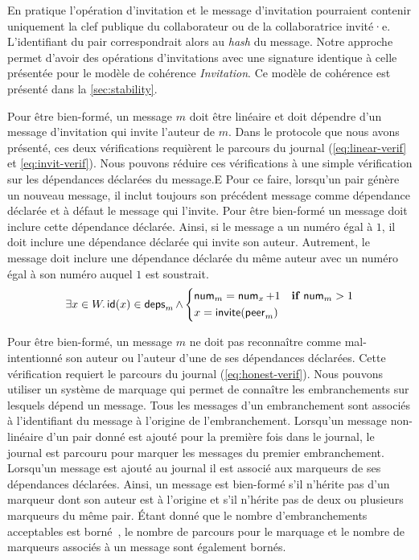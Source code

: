 En pratique l'opération d'invitation et le message d'invitation pourraient contenir uniquement la clef publique du collaborateur ou de la collaboratrice invité·e.
L'identifiant du pair correspondrait alors au \emph{hash} du message.
Notre approche permet d'avoir des opérations d'invitations avec une signature identique à celle présentée pour le modèle de cohérence \emph{Invitation}.
Ce modèle de cohérence est présenté dans la \autoref{sec:stability}.

Pour être bien-formé, un message $m$ doit être linéaire et doit dépendre d'un message d'invitation qui invite l'auteur de $m$.
Dans le protocole que nous avons présenté, ces deux vérifications requièrent le parcours du journal (\autoref{eq:linear-verif} et \autoref{eq:invit-verif}).
Nous pouvons réduire ces vérifications à une simple vérification sur les dépendances déclarées du message.E
Pour ce faire, lorsqu'un pair génère un nouveau message, il inclut toujours son précédent message comme dépendance déclarée et à défaut le message qui l'invite.
Pour être bien-formé un message doit inclure cette dépendance déclarée.
Ainsi, si le message a un numéro égal à $1$, il doit inclure une dépendance déclarée qui invite son auteur.
Autrement, le message doit inclure une dépendance déclarée du même auteur avec un numéro égal à son numéro auquel $1$ est soustrait.
%
\begin{equation}
    \exists x \in W \ldotp \operatorname{\mathsf{id}}(x) \in \operatorname{\mathsf{deps}}_m \land \begin{dcases}
    \operatorname{\mathsf{num}}_m = \operatorname{\mathsf{num}}_x + 1 & \mathrel{\mathbf{if}} \operatorname{\mathsf{num}}_m > 1\\
    x = \operatorname{\mathsf{invite}}(\operatorname{\mathsf{peer}}_m)
    \end{dcases}
\end{equation}

Pour être bien-formé, un message $m$ ne doit pas reconnaître comme mal-intentionné son auteur ou l'auteur d'une de ses dépendances déclarées.
Cette vérification requiert le parcours du journal (\autoref{eq:honest-verif}).
Nous pouvons utiliser un système de marquage qui permet de connaître les embranchements sur lesquels dépend un message.
Tous les messages d'un embranchement sont associés à l'identifiant du message à l'origine de l'embranchement.
Lorsqu'un message non-linéaire d'un pair donné est ajouté pour la première fois dans le journal, le journal est parcouru pour marquer les messages du premier embranchement.
Lorsqu'un message est ajouté au journal il est associé aux marqueurs de ses dépendances déclarées.
Ainsi, un message est bien-formé s'il n'hérite pas d'un marqueur dont son auteur est à l'origine et s'il n'hérite pas de deux ou plusieurs marqueurs du même pair.
Étant donné que le nombre d'embranchements acceptables est borné~\autocite{mahajan_2011_cac}, le nombre de parcours pour le marquage et le nombre de marqueurs associés à un message sont également bornés.

